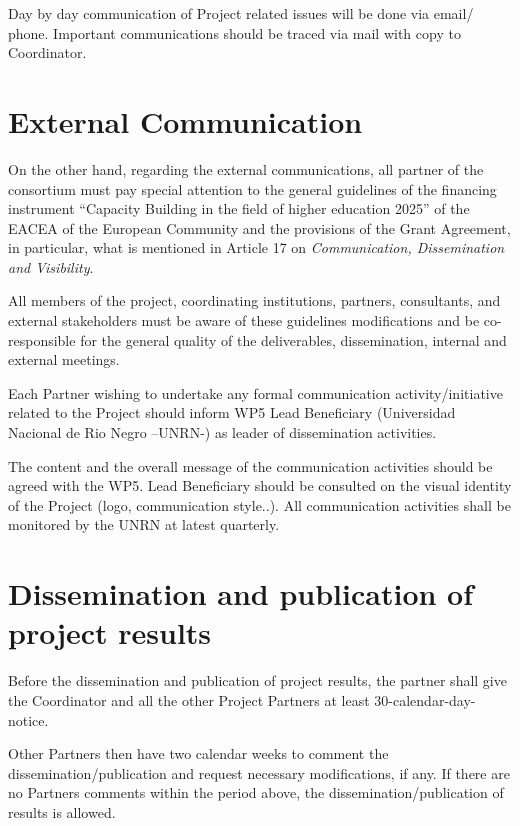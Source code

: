 \documentclass[
  12pt,
  oneside]{book}
\begin{document}
\endgroup{}

Day by day communication of Project related issues will be done via
email/ phone. Important communications should be traced via mail with
copy to Coordinator.

\section{External Communication}\label{external-communication}

On the other hand, regarding the external communications, all partner of
the consortium must pay special attention to the general guidelines of
the financing instrument ``Capacity Building in the field of higher
education 2025'' of the EACEA of the European Community and the
provisions of the Grant Agreement, in particular, what is mentioned in
Article 17 on \emph{Communication, Dissemination and Visibility}.

All members of the project, coordinating institutions, partners,
consultants, and external stakeholders must be aware of these guidelines
modifications and be co-responsible for the general quality of the
deliverables, dissemination, internal and external meetings.

Each Partner wishing to undertake any formal communication
activity/initiative related to the Project should inform WP5 Lead
Beneficiary (Universidad Nacional de Rio Negro --UNRN-) as leader of
dissemination activities.

The content and the overall message of the communication activities
should be agreed with the WP5. Lead Beneficiary should be consulted on
the visual identity of the Project (logo, communication style..). All
communication activities shall be monitored by the UNRN at latest
quarterly.

\section{Dissemination and publication of project
results}\label{dissemination-and-publication-of-project-results}

Before the dissemination and publication of project results, the partner
shall give the Coordinator and all the other Project Partners at least
30-calendar-day-notice.

Other Partners then have two calendar weeks to comment the
dissemination/publication and request necessary modifications, if any.
If there are no Partners comments within the period above, the
dissemination/publication of results is allowed.
\end{document}
